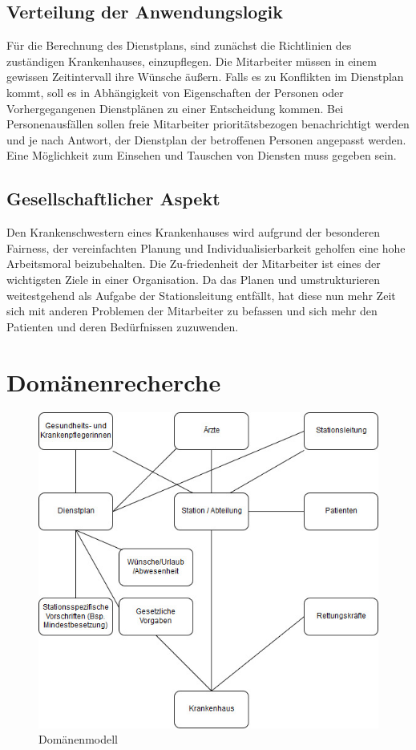 \documentclass[10pt,a4paper]{article}
\begin{document}
\subsection{Verteilung der Anwendungslogik}
Für die Berechnung des Dienstplans, sind zunächst die Richtlinien des zuständigen Krankenhauses, einzupflegen. Die Mitarbeiter müssen in einem gewissen Zeitintervall ihre Wünsche äußern. Falls es zu Konflikten im Dienstplan kommt, soll es in Abhängigkeit von Eigenschaften der Personen oder Vorhergegangenen Dienstplänen zu einer Entscheidung kommen. Bei Personenausfällen sollen freie Mitarbeiter prioritätsbezogen benachrichtigt werden und je nach Antwort, der Dienstplan der betroffenen Personen angepasst werden. Eine Möglichkeit zum Einsehen und Tauschen von Diensten muss gegeben sein.
\subsection{Gesellschaftlicher Aspekt}
Den Krankenschwestern eines Krankenhauses wird aufgrund der besonderen Fairness, der vereinfachten Planung und Individualisierbarkeit geholfen eine hohe Arbeitsmoral beizubehalten. Die Zu-friedenheit der Mitarbeiter ist eines der wichtigsten Ziele in einer Organisation. Da das Planen und umstrukturieren weitestgehend als Aufgabe der Stationsleitung entfällt, hat diese nun mehr Zeit sich mit anderen Problemen der Mitarbeiter zu befassen und sich mehr den Patienten und deren Bedürfnissen zuzuwenden.
\section{Domänenrecherche}
\begin{figure}[H]
\includegraphics[scale=0.6]{Bilder/Domaenenmodell.jpg}{\centering}
\caption{Domänenmodell}
\end{figure}
\end{document}
